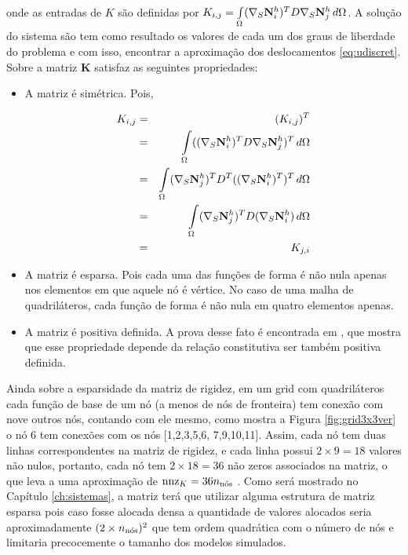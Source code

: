 onde as entradas de $K$ são definidas por  $K_{i,j} = \omeint{\kij{i}{j}}$. A solução do sistema são tem como resultado os valores de cada um dos graus de liberdade do problema e com isso, encontrar a aproximação dos deslocamentos \eqref{eq:udiscret}. Sobre a matriz $\mathbf{K}$ satisfaz as seguintes propriedades:


\begin{itemize}
    \item A matriz é simétrica. Pois,

    \begin{eqnarray}
    K_{i,j} & = & (K_{i,j})^T \\
            & = & \omeint{((\sopnabla \basefunctionfine)^T D \sopnabla \basefunctionfine[j])^T} \\
            & = & \omeint{ ( \sopnabla \basefunctionfine[j])^T D^T  ((\sopnabla \basefunctionfine)^T)^T}\\
            & = & \omeint{ ( \sopnabla \basefunctionfine[j])^T D  (\sopnabla \basefunctionfine)} \\
            & = & K_{j,i}
    \end{eqnarray}


    \item A matriz é esparsa. Pois cada uma das funções de forma é não nula apenas nos elementos em que aquele nó é vértice. No caso de uma malha de quadriláteros, cada função de forma é não nula em quatro elementos apenas.

    \item A matriz é positiva definida. A prova desse fato é encontrada em \cite{hughes}, que mostra que esse propriedade depende da relação constitutiva ser também positiva definida.
\end{itemize}


Ainda sobre a esparsidade da matriz de rigidez, em um grid com quadriláteros cada função de base de um nó (a menos de nós de fronteira) tem conexão com nove outros nós, contando com ele mesmo, como mostra a Figura \ref{fig:grid3x3ver} o nó 6 tem conexões com os nós [1,2,3,5,6, 7,9,10,11]. Assim, cada nó tem duas linhas correspondentes na matriz de rigidez, e cada linha possui $2 \times 9 = 18$ valores não nulos, portanto, cada nó tem $2 \times 18 = 36$ não zeros associados na matriz, o que leva a uma aproximação de $\text{nnz}_K = 36 \qtdnos$ . Como será mostrado no Capítulo \ref{ch:sistemas}, a matriz terá que utilizar alguma estrutura de matriz esparsa pois caso fosse alocada densa a quantidade de valores alocados seria aproximadamente $(2 \times \qtdnos)^2$ que tem ordem quadrática com o número de nós e limitaria precocemente o tamanho dos modelos simulados. 

